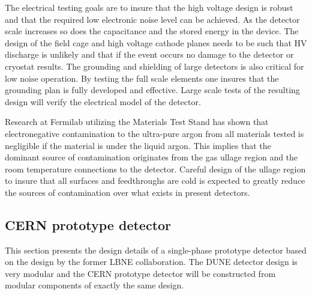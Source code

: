 	 
	 The electrical testing goals are to insure that the high voltage design is robust and that the required low electronic noise level can be achieved. As the detector scale increases so does the capacitance and the stored energy in the device. The design of the field cage and high voltage cathode planes needs to be such that HV discharge is unlikely and that if the event occurs no damage to the detector or cryostat results. The grounding and shielding of large detectors is also critical for low noise operation. By testing the full scale elements one insures that the grounding plan is fully developed and effective. Large scale tests of the resulting design will verify the electrical model of the detector. 

	 Research at Fermilab utilizing the Materials Test Stand has shown that electronegative contamination to the ultra-pure argon from all materials tested is negligible if the material is under the liquid argon. This implies that the dominant source of contamination originates from the gas ullage region and the room temperature connections to the detector. Careful design of the ullage region to insure that all surfaces and feedthroughs are cold is expected to greatly reduce the sources of contamination over what exists in present detectors. 
	 
\subsection{CERN prototype detector}


This section presents the design details of a single-phase prototype detector based on the design by the former LBNE collaboration. 
The DUNE detector design is very modular and the CERN prototype detector will be constructed from modular components of exactly the same design.

